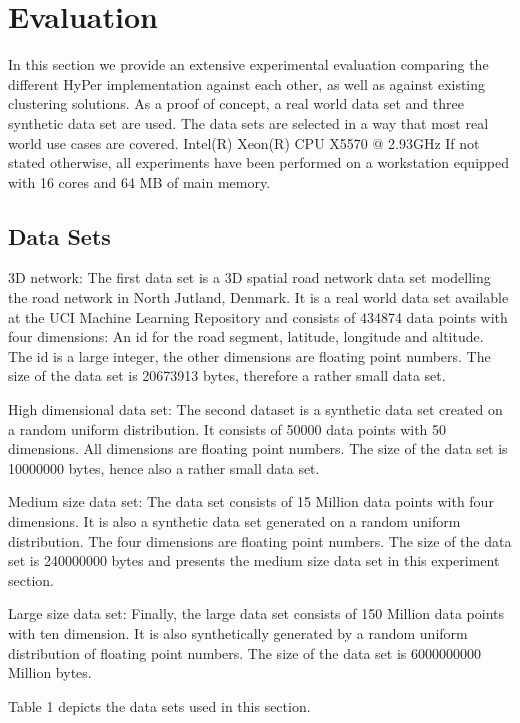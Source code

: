 \chapter{Evaluation}\label{chapter:evaluation}

In this section we provide an extensive experimental evaluation comparing the different  HyPer implementation against each other, as well as against existing clustering solutions. As a proof of concept, a real world data set and three synthetic data set are used. The data sets are selected in a way that most real world use cases are covered.
Intel(R) Xeon(R) CPU           X5570  @ 2.93GHz
If not stated otherwise, all experiments have been performed on a workstation equipped with 16 cores and 64 MB of main memory.


\section{Data Sets}

3D network: The first data set is a 3D spatial road network data set modelling the road network in North Jutland, Denmark. It is a real world data set available at the UCI Machine Learning Repository and consists of 434874 data points with four dimensions: An id for the road segment, latitude, longitude and altitude. The id is a large integer, the other dimensions are floating point numbers. The size of the data set is 20673913 bytes, therefore a rather small data set.

High dimensional data set: The second dataset is a synthetic data set created on a random uniform distribution. It consists of 50000 data points with 50 dimensions. All dimensions are floating point numbers. The size of the data set is 10000000 bytes, hence also a rather small data set.


Medium size data set: The data set consists of 15 Million data points with four dimensions. It is also a synthetic data set generated on a random uniform distribution. The four dimensions are floating point numbers. The size of the data set is 240000000 bytes and presents the medium size data set in this experiment section.

Large size data set: Finally, the large data set consists of 150 Million data points with ten dimension. It is also synthetically generated by a random uniform distribution of floating point numbers. The size of the data set is 6000000000 Million bytes.

Table 1 depicts the data sets used in this section.


